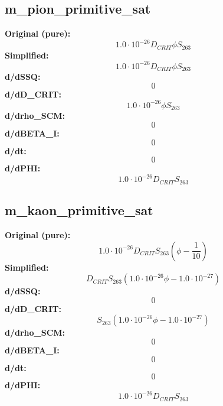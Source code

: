 \subsection{m_pion_primitive_sat}
\textbf{Original (pure):}
\begin{equation}
1.0 \cdot 10^{-26} D_{CRIT} \phi S_{26 3}
\end{equation}
\textbf{Simplified:}
\begin{equation}
1.0 \cdot 10^{-26} D_{CRIT} \phi S_{26 3}
\end{equation}
\textbf{d/dSSQ:}
\begin{equation}
0
\end{equation}
\textbf{d/dD_CRIT:}
\begin{equation}
1.0 \cdot 10^{-26} \phi S_{26 3}
\end{equation}
\textbf{d/drho_SCM:}
\begin{equation}
0
\end{equation}
\textbf{d/dBETA_I:}
\begin{equation}
0
\end{equation}
\textbf{d/dt:}
\begin{equation}
0
\end{equation}
\textbf{d/dPHI:}
\begin{equation}
1.0 \cdot 10^{-26} D_{CRIT} S_{26 3}
\end{equation}

\subsection{m_kaon_primitive_sat}
\textbf{Original (pure):}
\begin{equation}
1.0 \cdot 10^{-26} D_{CRIT} S_{26 3} \left(\phi - \frac{1}{10}\right)
\end{equation}
\textbf{Simplified:}
\begin{equation}
D_{CRIT} S_{26 3} \left(1.0 \cdot 10^{-26} \phi - 1.0 \cdot 10^{-27}\right)
\end{equation}
\textbf{d/dSSQ:}
\begin{equation}
0
\end{equation}
\textbf{d/dD_CRIT:}
\begin{equation}
S_{26 3} \left(1.0 \cdot 10^{-26} \phi - 1.0 \cdot 10^{-27}\right)
\end{equation}
\textbf{d/drho_SCM:}
\begin{equation}
0
\end{equation}
\textbf{d/dBETA_I:}
\begin{equation}
0
\end{equation}
\textbf{d/dt:}
\begin{equation}
0
\end{equation}
\textbf{d/dPHI:}
\begin{equation}
1.0 \cdot 10^{-26} D_{CRIT} S_{26 3}
\end{equation}


